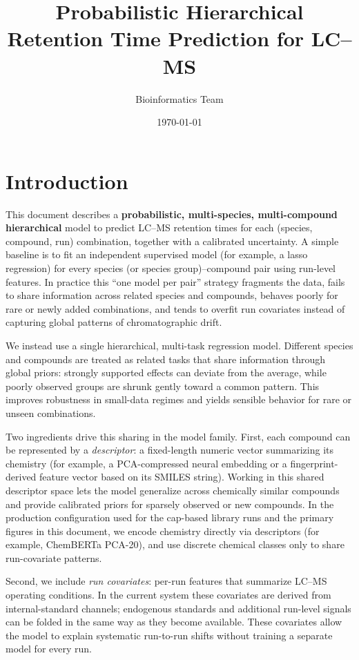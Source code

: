 \documentclass[11pt]{article}
\title{Probabilistic Hierarchical Retention Time Prediction for LC--MS}
\author{Bioinformatics Team}
\date{\today}
\begin{document}
\maketitle

\section{Introduction}

This document describes a \textbf{probabilistic, multi-species, multi-compound hierarchical}
model to predict
LC--MS retention times for each (species, compound, run) combination, together with a
calibrated uncertainty. A simple baseline is to fit an independent supervised model
(for example, a lasso regression) for every species (or species group)--compound pair
using run-level features. In practice this ``one model per pair'' strategy fragments
the data, fails to share information across related species and compounds, behaves
poorly for rare or newly added combinations, and tends to overfit run covariates
instead of capturing global patterns of chromatographic drift.

We instead use a single hierarchical, multi-task regression model. Different
species and compounds are treated as related tasks that share information through
global priors: strongly supported effects can deviate from the average, while poorly
observed groups are shrunk gently toward a common pattern. This improves robustness in
small-data regimes and yields sensible behavior for rare or unseen combinations.

Two ingredients drive this sharing in the model family. First, each compound can be
represented by a \emph{descriptor}: a fixed-length numeric vector summarizing its
chemistry (for example, a PCA-compressed neural embedding or a fingerprint-derived
feature vector based on its SMILES string). Working in this shared descriptor space
lets the model generalize across chemically similar compounds and provide calibrated
priors for sparsely observed or new compounds. In the production configuration used
for the cap-based library runs and the primary figures in this document, we encode
chemistry directly via descriptors (for example, ChemBERTa PCA-20), and use discrete
chemical classes only to share run-covariate patterns.

Second, we include \emph{run covariates}: per-run features that summarize LC--MS
operating conditions. In the current system these covariates are derived from
internal-standard channels; endogenous standards and additional run-level signals can
be folded in the same way as they become available. These covariates allow the model
to explain systematic run-to-run shifts without training a separate model for every
run.
\end{document}
